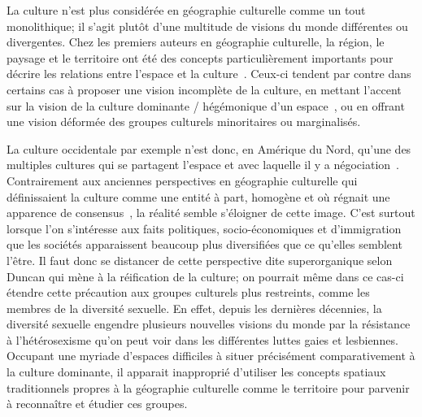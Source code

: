 La culture n'est plus considérée en géographie culturelle comme un tout monolithique; il s'agit plutôt d'une multitude de visions du monde différentes ou divergentes.
Chez les premiers auteurs en géographie culturelle, la région, le paysage et le territoire ont été des concepts particulièrement importants  pour décrire les relations entre l'espace et la culture~\citep{Bonnemaison1981,Monnet1998,DiMeo1998,}.
Ceux-ci tendent par contre dans certains cas à proposer une vision incomplète de la culture, en mettant l'accent sur la vision de la culture dominante / hégémonique d'un espace~\citep[11-12]{Duncan1993}, ou en offrant une vision déformée des groupes culturels minoritaires ou marginalisés.

La culture occidentale par exemple n'est donc, en Amérique du Nord, qu'une des multiples cultures qui se partagent l'espace et avec laquelle il y a négociation~\citep[11]{Duncan1993}.
Contrairement aux anciennes perspectives en géographie culturelle qui définissaient la culture comme une entité à part, homogène et où régnait une apparence de consensus~\citep{Duncan1980}, la réalité semble s'éloigner de cette image.
C'est surtout lorsque l'on s'intéresse aux faits politiques, socio-économiques et d'immigration que les sociétés apparaissent beaucoup plus diversifiées que ce qu'elles semblent l'être.
Il faut donc se distancer de cette perspective dite superorganique selon Duncan qui mène à la réification de la culture; on pourrait même dans ce cas-ci étendre cette précaution aux groupes culturels plus restreints, comme les membres de la diversité sexuelle.
En effet, depuis les dernières décennies, la diversité sexuelle engendre plusieurs nouvelles visions du monde par la résistance à l'hétérosexisme qu'on peut voir dans les différentes luttes gaies et lesbiennes.
Occupant une myriade d'espaces difficiles à situer précisément comparativement à la culture dominante, il apparait inapproprié d'utiliser les concepts spatiaux traditionnels propres à la géographie culturelle comme le territoire pour parvenir à reconnaître et étudier ces groupes.


